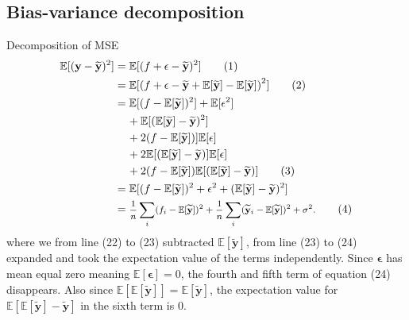 \documentclass[a4paper,twocolumn]{article}
\newcommand\numberthis{\addtocounter{equation}{1}\tag{\theequation}}
\newcommand{\E}{\mathbb{E}}
\newcommand{\y}{\mathbf{y}}
\newcommand{\ytilde}{\mathbf{\widetilde{y}}}
\begin{document}
\begin{appendices}
\section{Bias-variance decomposition}\label{app:A}
Decomposition of MSE
\begin{align*}
    \E[(\y - \ytilde)^{2}] &= \E[(f + \mathbf{\epsilon} 
    - \ytilde)^{2}]\numberthis\label{eqn}\\
    &=\E[\left(f + \mathbf{\epsilon} - \ytilde + \E[\ytilde] - \E[\ytilde]\right)^{2}]\numberthis\label{eqn}\\
    &= \E[(f - \E[\ytilde])^{2}] + \E[\mathbf{\epsilon}^{2}]\\ &\hspace{0.4cm}+ \E[(\E[\ytilde] - \ytilde)^{2}]\\
    &\hspace{0.4cm}+ 2(f - \E[\ytilde])]\E[\mathbf{\epsilon}] \\
    &\hspace{0.4cm}+ 2\E[(\E[\ytilde] - \ytilde)]\E[\mathbf{\epsilon}] \\
    &\hspace{0.4cm}+ 2(f - \E[\ytilde])\E[(\E[\ytilde]-\ytilde)]\numberthis\label{eqn}\\
    &= \E[(f-\E[\ytilde])^{2} + \mathbf{\epsilon}^{2} + (\E[\ytilde] - \ytilde)^{2}]\\
    &=\text{\footnotesize$\frac{1}{n}\sum_{i}(f_{i} - \E[\ytilde])^{2} + \frac{1}{n}\sum_{i}(\ytilde_{i} - \E[\ytilde])^{2} + \sigma^{2}.$}\numberthis\label{eqn}
\end{align*}
where we from line (22) to (23) subtracted $\E[\ytilde]$, from line (23) to (24) expanded and took the expectation value of the terms independently. Since $\mathbf{\epsilon}$ has mean equal zero meaning $\E[\mathbf{\epsilon}] = 0$, the fourth and fifth term of equation (24) disappears. Also since $\E[\E[\ytilde]] = \E[\ytilde]$, the expectation value for $\E[\E[\ytilde] - \ytilde]$ in the sixth term is 0.
\end{appendices}
\end{document}
